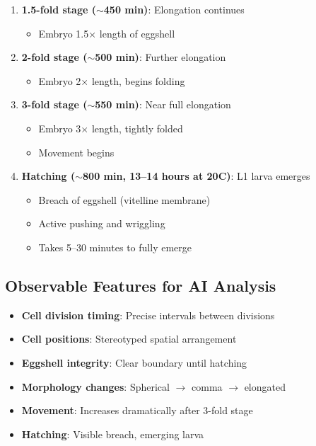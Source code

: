 \documentclass[11pt,letterpaper]{article}
\begin{document}
\begin{enumerate}
    \item \textbf{1.5-fold stage ($\sim$450 min)}: Elongation continues
    \begin{itemize}
        \item Embryo 1.5$\times$ length of eggshell
    \end{itemize}

    \item \textbf{2-fold stage ($\sim$500 min)}: Further elongation
    \begin{itemize}
        \item Embryo 2$\times$ length, begins folding
    \end{itemize}

    \item \textbf{3-fold stage ($\sim$550 min)}: Near full elongation
    \begin{itemize}
        \item Embryo 3$\times$ length, tightly folded
        \item Movement begins
    \end{itemize}

    \item \textbf{Hatching ($\sim$800 min, 13--14 hours at 20\textdegree C)}: L1 larva emerges
    \begin{itemize}
        \item Breach of eggshell (vitelline membrane)
        \item Active pushing and wriggling
        \item Takes 5--30 minutes to fully emerge
    \end{itemize}
\end{enumerate}

\subsection{Observable Features for AI Analysis}
\begin{itemize}
    \item \textbf{Cell division timing}: Precise intervals between divisions
    \item \textbf{Cell positions}: Stereotyped spatial arrangement
    \item \textbf{Eggshell integrity}: Clear boundary until hatching
    \item \textbf{Morphology changes}: Spherical $\rightarrow$ comma $\rightarrow$ elongated
    \item \textbf{Movement}: Increases dramatically after 3-fold stage
    \item \textbf{Hatching}: Visible breach, emerging larva
\end{itemize}
\end{document}
